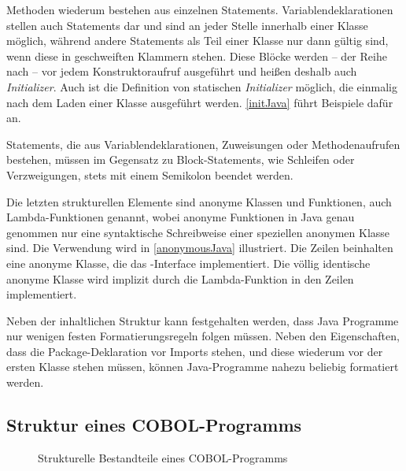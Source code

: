 Methoden wiederum bestehen aus einzelnen Statements. Variablendeklarationen stellen auch Statements dar und sind an jeder Stelle innerhalb einer Klasse möglich, während andere Statements als Teil einer Klasse nur dann gültig sind, wenn diese in geschweiften Klammern stehen. Diese Blöcke werden -- der Reihe nach -- vor jedem Konstruktoraufruf ausgeführt und heißen deshalb auch \textit{Initializer}. Auch ist die Definition von statischen \textit{Initializer} möglich, die einmalig nach dem Laden einer Klasse ausgeführt werden. \autoref{initJava} führt Beispiele dafür an.


Statements, die aus Variablendeklarationen, Zuweisungen oder Methodenaufrufen bestehen, müssen im Gegensatz zu Block-Statements, wie \zB Schleifen oder Verzweigungen, stets mit einem Semikolon beendet werden. 

Die letzten strukturellen Elemente sind anonyme Klassen und Funktionen, auch Lambda-Funktionen genannt, wobei anonyme Funktionen in Java genau genommen nur eine syntaktische Schreibweise einer speziellen anonymen Klasse sind. Die Verwendung wird in \autoref{anonymousJava} illustriert. Die Zeilen  beinhalten eine anonyme Klasse, die das -Interface implementiert. Die völlig identische  anonyme Klasse wird implizit durch die Lambda-Funktion in den Zeilen  implementiert.


Neben der inhaltlichen Struktur kann festgehalten werden, dass Java Programme nur wenigen festen Formatierungsregeln folgen müssen. Neben den Eigenschaften, dass die Package-Deklaration vor Imports stehen, und diese wiederum vor der ersten Klasse stehen müssen, können Java-Programme nahezu beliebig formatiert werden.

\subsection*{Struktur eines COBOL-Programms}\label{cobolstructure}

\begin{figure}[H]
    \centering
    \resizebox{.9\linewidth}{!}{\unskip}
    \caption{Strukturelle Bestandteile eines COBOL-Programms \label{cobolStructureDiagram}}
\end{figure}

